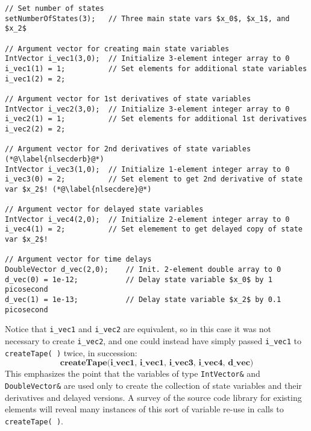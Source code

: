 \begin{lstlisting}[firstnumber=1, label={nonlinear:sinitctex},
    caption={Example creating input vectors passed to createTape(~)}]
// Set number of states
setNumberOfStates(3);   // Three main state vars $x_0$, $x_1$, and $x_2$

// Argument vector for creating main state variables
IntVector i_vec1(3,0);  // Initialize 3-element integer array to 0
i_vec1(1) = 1;          // Set elements for additional state variables
i_vec1(2) = 2;

// Argument vector for 1st derivatives of state variables
IntVector i_vec2(3,0);  // Initialize 3-element integer array to 0
i_vec2(1) = 1;          // Set elements for additional 1st derivatives
i_vec2(2) = 2;

// Argument vector for 2nd derivatives of state variables  (*@\label{nlsecderb}@*)
IntVector i_vec3(1,0);  // Initialize 1-element integer array to 0
i_vec3(0) = 2;          // Set element to get 2nd derivative of state var $x_2$! (*@\label{nlsecdere}@*)

// Argument vector for delayed state variables
IntVector i_vec4(2,0);  // Initialize 2-element integer array to 0
i_vec4(1) = 2;          // Set elemement to get delayed copy of state var $x_2$!

// Argument vector for time delays
DoubleVector d_vec(2,0);    // Init. 2-element double array to 0
d_vec(0) = 1e-12;           // Delay state variable $x_0$ by 1 picosecond
d_vec(1) = 1e-13;           // Delay state variable $x_2$ by 0.1 picosecond
\end{lstlisting}

Notice that \texttt{i\_vec1} and \texttt{i\_vec2} are equivalent, so in this
case it was not necessary to create \texttt{i\_vec2}, and one could instead
have simply passed \texttt{i\_vec1} to \texttt{createTape(~)} twice, in succession:
\newline
\[\textbf{createTape(i\_vec1, i\_vec1, i\_vec3, i\_vec4, d\_vec)}\]
\newline
This emphasizes the point that the variables of type \texttt{IntVector\&}
and \texttt{DoubleVector\&} are used only to create the collection of
state variables and their derivatives and delayed versions.  A survey of
the source code library for existing \FDA elements will reveal many instances
of this sort of variable re-use in calls to \texttt{createTape(~)}.

